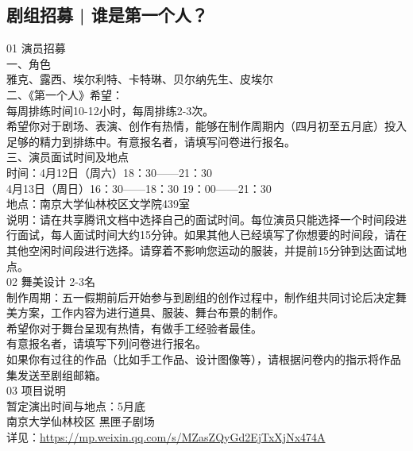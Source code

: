 \documentclass[letterpaper, 12pt]{article}
\begin{document}
\begin{multicols}{2}
\subsection{剧组招募 | 谁是第一个人？}
01 演员招募
\\一、角色
\\雅克、露西、埃尔利特、卡特琳、贝尔纳先生、皮埃尔
\\二、《第一个人》希望：
\\每周排练时间10-12小时，每周排练2-3次。
\\希望你对于剧场、表演、创作有热情，能够在制作周期内（四月初至五月底）投入足够的精力到排练中。有意报名者，请填写问卷进行报名。
\\三、演员面试时间及地点
\\时间：4月12日（周六）18：30——21：30
\\4月13日（周日）16：30——18：30  19：00——21：30
\\地点：南京大学仙林校区文学院439室
\\说明：请在共享腾讯文档中选择自己的面试时间。每位演员只能选择一个时间段进行面试，每人面试时间大约15分钟。如果其他人已经填写了你想要的时间段，请在其他空闲时间段进行选择。请穿着不影响您运动的服装，并提前15分钟到达面试地点。
\\02 舞美设计 2-3名
\\制作周期：五一假期前后开始参与到剧组的创作过程中，制作组共同讨论后决定舞美方案，工作内容为进行道具、服装、舞台布景的制作。
\\希望你对于舞台呈现有热情，有做手工经验者最佳。
\\有意报名者，请填写下列问卷进行报名。
\\如果你有过往的作品（比如手工作品、设计图像等），请根据问卷内的指示将作品集发送至剧组邮箱。
\\03 项目说明
\\暂定演出时间与地点：5月底
\\南京大学仙林校区 黑匣子剧场
\\详见：\url{https://mp.weixin.qq.com/s/MZasZQyGd2EjTxXjNx474A}
\end{multicols}
\end{document}
